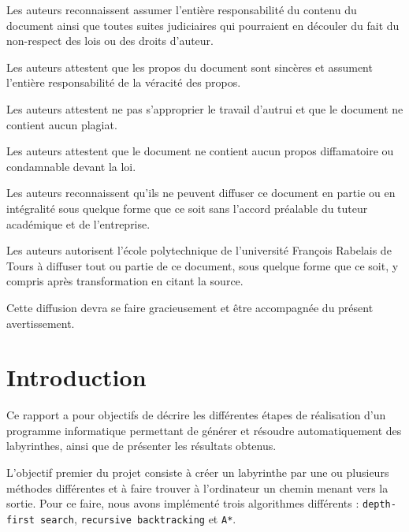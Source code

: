 \documentclass[12pt]{scrreprt} %
\begin{document}
Les auteurs reconnaissent assumer l’entière responsabilité du contenu du document ainsi que toutes suites judiciaires qui pourraient en découler du fait du non-respect des lois ou des droits d’auteur.

Les auteurs attestent que les propos du document sont sincères et assument l’entière responsabilité de la véracité des propos.

Les auteurs attestent ne pas s’approprier le travail d’autrui et que le document ne contient aucun plagiat.

Les auteurs attestent que le document ne contient aucun propos diffamatoire ou condamnable devant la loi.

Les auteurs reconnaissent qu’ils ne peuvent diffuser ce document en partie ou en intégralité sous quelque forme que ce soit sans l’accord préalable du tuteur académique et de l’entreprise.

Les auteurs autorisent l’école polytechnique de l’université François Rabelais de Tours à diffuser tout ou partie de ce document, sous quelque forme que ce soit, y compris après transformation en citant la source.

Cette diffusion devra se faire gracieusement et être accompagnée du présent avertissement.

\newpage
\renewcommand{\contentsname}{Table des matières} %
\tableofcontents


\newpage
\chapter*{Introduction}


Ce rapport a pour objectifs de décrire les différentes étapes de réalisation d'un programme informatique permettant de générer et résoudre automatiquement des labyrinthes, ainsi que de présenter les résultats obtenus.

L'objectif premier du projet consiste à créer un labyrinthe par une ou plusieurs méthodes différentes et à faire trouver à l'ordinateur un chemin menant vers la sortie. Pour ce faire, nous avons implémenté trois algorithmes différents :
\texttt{depth-first search}, \texttt{recursive backtracking} et \texttt{A*}.
\end{document}
